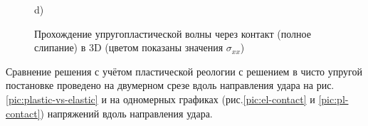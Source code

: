 \begin{figure}
\begin{minipage}{0.4\linewidth}
 d)\\
\end{minipage}
\caption{Прохождение упругопластической волны через контакт (полное слипание) в 3D (цветом показаны значения $\sigma_{xx}$)}
\label{pic:two-mat-3d}
\end{figure}

Сравнение решения с учётом пластической реологии с решением в чисто упругой постановке проведено на двумерном срезе вдоль направления удара на рис.\ref{pic:plastic-vs-elastic} и на одномерных графиках (рис.\ref{pic:el-contact} и \ref{pic:pl-contact}) напряжений вдоль направления удара.

